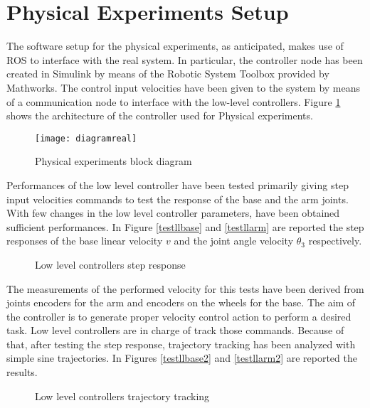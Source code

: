 \section{Physical Experiments Setup}
	The software setup for the physical experiments, as anticipated, makes use of ROS to interface with the real system. In particular, the controller node has been created in Simulink by means of the Robotic System Toolbox provided by Mathworks. The control input velocities have been given to the system by means of a communication node to interface with the low-level controllers. Figure \ref{diagramreal} shows the architecture of the controller used for Physical experiments.
	\begin{figure}[h!]
	\begin{center} 
		\texttt{[image: diagramreal]}
		\centering
		\label{diagramreal}
		\caption{Physical experiments block diagram} 
	\end{center}
	\end{figure}
	Performances of the low level controller have been tested primarily giving step input velocities commands to test the response of the base and the arm joints. With few changes in the low level controller parameters, have been obtained sufficient performances. In Figure \ref{testllbase} and \ref{testllarm} are reported the step responses of the base linear velocity $v$ and the joint angle velocity $\theta_3$ respectively.
	\begin{figure}[ht]
	\centering
	\qquad
	\caption{Low level controllers step response}
	\end{figure}
	The measurements of the performed velocity for this tests have been derived from joints encoders for the arm and encoders on the wheels for the base. The aim of the controller is to generate proper velocity control action to perform a desired task. Low level controllers are in charge of track those commands. Because of that, after testing the step response, trajectory tracking has been analyzed with simple sine trajectories. In Figures \ref{testllbase2} and \ref{testllarm2} are reported the results.
	\begin{figure}[ht]
	\centering
	\qquad
	\qquad
	\qquad
	\caption{Low level controllers trajectory tracking}
	\end{figure} \\
